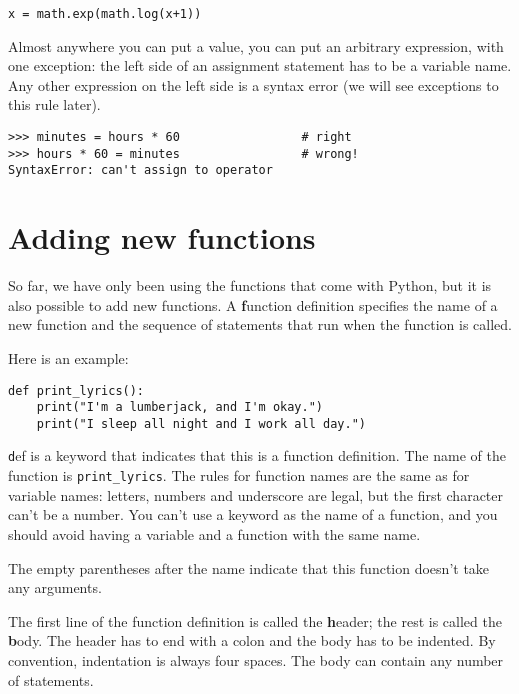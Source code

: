 \documentclass[
DIV=11,
fontsize=12,
twoside,
headinclude=false,
titlepage=firstiscover,
abstract=true,
headsepline=true,
footsepline=true,
chapterprefix=true, %
headings=big,
bibliography=totoc,%
captions=tableheading
]{scrbook}
\theoremstyle{definition}
\begin{document}
\begin{lstlisting}
x = math.exp(math.log(x+1))
\end{lstlisting}
%
Almost anywhere you can put a value, you can put an arbitrary
expression, with one exception: the left side of an assignment
statement has to be a variable name.  Any other expression on the left
side is a syntax error (we will see exceptions to this rule
later).

\begin{lstlisting}
>>> minutes = hours * 60                 # right
>>> hours * 60 = minutes                 # wrong!
SyntaxError: can't assign to operator
\end{lstlisting}
%


\section{Adding new functions}

So far, we have only been using the functions that come with Python,
but it is also possible to add new functions.
A {\textbf function definition} specifies the name of a new function and
the sequence of statements that run when the function is called.

Here is an example:

\begin{lstlisting}
def print_lyrics():
    print("I'm a lumberjack, and I'm okay.")
    print("I sleep all night and I work all day.")
\end{lstlisting}
%
{\texttt def} is a keyword that indicates that this is a function
definition.  The name of the function is \verb"print_lyrics".  The
rules for function names are the same as for variable names: letters,
numbers and underscore are legal, but the first character
can't be a number.  You can't use a keyword as the name of a function,
and you should avoid having a variable and a function with the same
name.

The empty parentheses after the name indicate that this function
doesn't take any arguments.

The first line of the function definition is called the {\textbf header};
the rest is called the {\textbf body}.  The header has to end with a colon
and the body has to be indented.  By convention, indentation is
always four spaces.  The body can contain
any number of statements.
\end{document}
